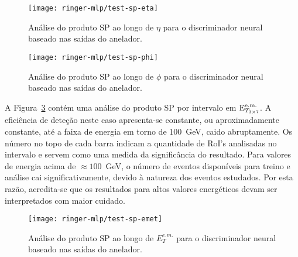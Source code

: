 \begin{figure}
\begin{center}
\texttt{[image: ringer-mlp/test-sp-eta]}
\end{center}
\caption{Análise do produto SP ao longo de $\eta$ para o discriminador neural
baseado nas saídas do anelador.}
\label{fig:ringer-test-sp-eta}
\end{figure}

\begin{figure}
\begin{center}
\texttt{[image: ringer-mlp/test-sp-phi]}
\end{center}
\caption{Análise do produto SP ao longo de $\phi$ para o discriminador neural
baseado nas saídas do anelador.}
\label{fig:ringer-test-sp-phi}
\end{figure}

A Figura~\ref{fig:ringer-test-sp-emet} contém uma análise do produto SP por
intervalo em $\text{E}^{\text{e.m.}}_{T_{3\times7}}$. A eficiência de deteção neste caso apresenta-se
constante, ou aproximadamente constante, até a faixa de energia em torno de
100~GeV, caido abruptamente. Os número no topo de cada barra indicam a
quantidade de RoI's analisadas no intervalo e servem como uma medida da
significância do resultado. Para valores de energia acima de $\approx
100$~GeV, o número de eventos disponíveis para treino e análise cai
significativamente, devido à natureza dos eventos estudados. Por esta razão,
acredita-se que os resultados para altos valores energéticos devam ser
interpretados com maior cuidado.

\begin{figure}
\begin{center}
\texttt{[image: ringer-mlp/test-sp-emet]}
\end{center}
\caption{Análise do produto SP ao longo de $E^{e.m.}_T$ para o discriminador
neural baseado nas saídas do anelador.}
\label{fig:ringer-test-sp-emet}
\end{figure}


